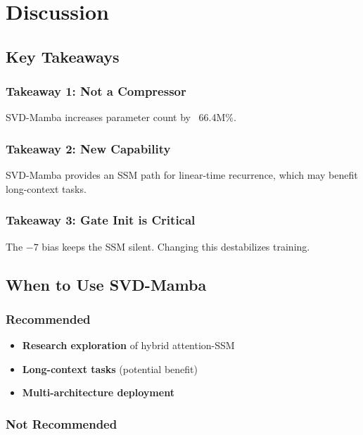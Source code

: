 
\section{Discussion}

\subsection{Key Takeaways}

\subsubsection{Takeaway 1: Not a Compressor}

SVD-Mamba increases parameter count by ~66.4M\%.

\subsubsection{Takeaway 2: New Capability}

SVD-Mamba provides an SSM path for linear-time recurrence, which may 
benefit long-context tasks.

\subsubsection{Takeaway 3: Gate Init is Critical}

The $-7$ bias keeps the SSM silent. Changing this destabilizes training.

\subsection{When to Use SVD-Mamba}

\subsubsection{Recommended}

\begin{itemize}
\item \textbf{Research exploration} of hybrid attention-SSM
\item \textbf{Long-context tasks} (potential benefit)
\item \textbf{Multi-architecture deployment}

\end{itemize}
\subsubsection{Not Recommended}

